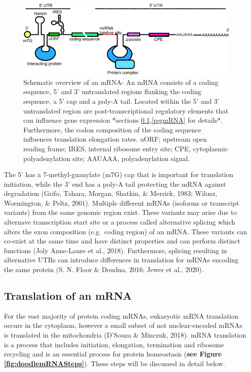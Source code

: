 \documentclass[12pt,openany]{book}
\begin{document}
\begin{figure}[H]
  \includegraphics{./figures/UTRFeatures_2.pdf}
  \caption{ Schematic overview of an mRNA- An mRNA consists of a coding sequence, 5' and 3' untranslated regions flanking the coding sequence, a 5' cap and a poly-A tail. Located within the 5' and 3' untranslated region are post-transcriptional regulatory elements that can influence gene expression *sections \ref{translation},\ref{regmRNA} for details*. Furthermore, the codon composition of the coding sequence influences translation elongation rates. uORF; upstream open reading frame; IRES, internal ribosome entry site; CPE, cytoplasmic polyadenylation site; AAUAAA, polyadenylation signal.
 \label{fig:UTRFeat}}
\end{figure}

The 5' has a 7-methyl-guanylate (m7G) cap that is important for
translation initiation, while the 3' end has a poly-A tail protecting
the mRNA against degradation (Grifo, Tahara, Morgan, Shatkin, \&
Merrick, 1983; Wilusz, Wormington, \& Peltz, 2001). Multiple different
mRNAs (isoforms or transcript variants) from the same genomic region
exist. These variants may arise due to alternave transcription start
site or a process called alternative splicing which alters the exon
composition (e.g.~coding region) of an mRNA. These variants can co-exist
at the same time and have distinct properties and can perform distinct
functions (Joly Anne-Laure et al., 2018). Furthermore, splicing
resulting in alternative UTRs can introduce differences in translation
for mRNAs encoding the same protein (S. N. Floor \& Doudna, 2016; Jewer
et al., 2020).

\subsection{Translation of an mRNA} \label{translation}

For the vast majority of protein coding mRNAs, eukaryotic mRNA
translation occurs in the cytoplasm, however a small subset of not
nuclear-encoded mRNAs is translated in the mitochondria (D'Souza \&
Minczuk, 2018). mRNA translation is a process that includes initiation,
elongation, termination and ribosome recycling and is an essential
process for protein homeostasis (\textbf{see Figure
\ref{fig:doodlemRNASteps}}). These steps will be discussed in detail
below.
\end{document}
